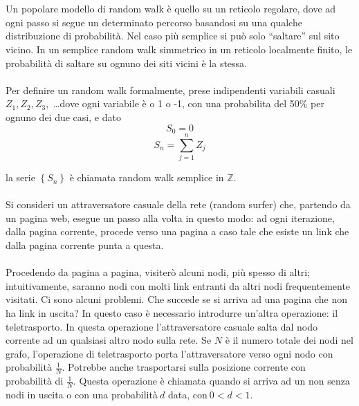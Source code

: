 \\\\
Un popolare modello di random walk è quello su un reticolo regolare, dove ad ogni passo si segue un determinato percorso basandosi su una qualche distribuzione di probabilità. Nel caso più semplice si può solo “saltare” sul sito vicino. In un semplice random walk simmetrico in un reticolo localmente finito, le probabilità di saltare su ognuno dei siti vicini è la stessa.
\\\\
Per definire un random walk formalmente, prese indipendenti variabili casuali $ Z_1, Z_2, Z_3, $ \dots dove ogni variabile è o 1 o -1, con una probabilita del 50\% per ognuno dei due casi, e dato 
\begin{equation}
  S_0 = 0
\end{equation}
\begin{equation}
  S_n = \sum_{j=1}^{n} Z_j
\end{equation}
  
la serie $\left \{ S_n \right \} $ è chiamata random walk semplice in $\mathbb{Z}$.
\\\\
Si consideri un attraversatore casuale della rete (random surfer) che, partendo da un pagina web, esegue un passo alla volta in questo modo: ad ogni iterazione, dalla pagina corrente, procede verso una pagina a caso tale che esiste un link che dalla pagina corrente punta a questa.
\\\\
Procedendo da pagina a pagina, visiterò alcuni nodi, più spesso di altri; intuitivamente, saranno nodi con molti link entranti da altri nodi frequentemente visitati. Ci sono alcuni problemi. Che succede se si arriva ad una pagina che non ha link in uscita? In questo caso è necessario introdurre un’altra operazione: il teletrasporto. In questa operazione l’attraversatore casuale salta dal nodo corrente ad un qualsiasi altro nodo sulla rete.
Se $N$ è il numero totale dei nodi nel grafo, l’operazione di teletrasporto porta l’attraversatore verso ogni nodo con probabilità $\frac{1}{N}$. Potrebbe anche trasportarsi sulla posizione corrente con probabilità di $\frac{1}{N}$. Questa operazione è chiamata quando si arriva ad un non senza nodi in uscita o con una probabilità$\ d$ data, con$\ 0 < d < 1$.


